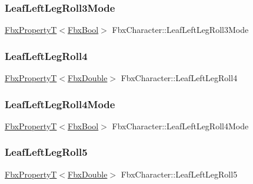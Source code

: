 \subsubsection{\texorpdfstring{Leaf\+Left\+Leg\+Roll3\+Mode}{LeafLeftLegRoll3Mode}}
{\footnotesize\ttfamily \hyperlink{class_fbx_property_t}{Fbx\+PropertyT}$<$\hyperlink{fbxtypes_8h_a92e0562b2fe33e76a242f498b362262e}{Fbx\+Bool}$>$ Fbx\+Character\+::\+Leaf\+Left\+Leg\+Roll3\+Mode}

\mbox{\label{class_fbx_character_a9b83334b1cf885a85b9679e267e54093}} 
\subsubsection{\texorpdfstring{Leaf\+Left\+Leg\+Roll4}{LeafLeftLegRoll4}}
{\footnotesize\ttfamily \hyperlink{class_fbx_property_t}{Fbx\+PropertyT}$<$\hyperlink{fbxtypes_8h_a171e72a1c46fc15c1a6c9c31948c1c5b}{Fbx\+Double}$>$ Fbx\+Character\+::\+Leaf\+Left\+Leg\+Roll4}

\mbox{\label{class_fbx_character_ab3c7bdee28e6e855e6e5ef53ad053689}} 
\subsubsection{\texorpdfstring{Leaf\+Left\+Leg\+Roll4\+Mode}{LeafLeftLegRoll4Mode}}
{\footnotesize\ttfamily \hyperlink{class_fbx_property_t}{Fbx\+PropertyT}$<$\hyperlink{fbxtypes_8h_a92e0562b2fe33e76a242f498b362262e}{Fbx\+Bool}$>$ Fbx\+Character\+::\+Leaf\+Left\+Leg\+Roll4\+Mode}

\mbox{\label{class_fbx_character_aaacb001144169bc23af82338a4908f9f}} 
\subsubsection{\texorpdfstring{Leaf\+Left\+Leg\+Roll5}{LeafLeftLegRoll5}}
{\footnotesize\ttfamily \hyperlink{class_fbx_property_t}{Fbx\+PropertyT}$<$\hyperlink{fbxtypes_8h_a171e72a1c46fc15c1a6c9c31948c1c5b}{Fbx\+Double}$>$ Fbx\+Character\+::\+Leaf\+Left\+Leg\+Roll5}


